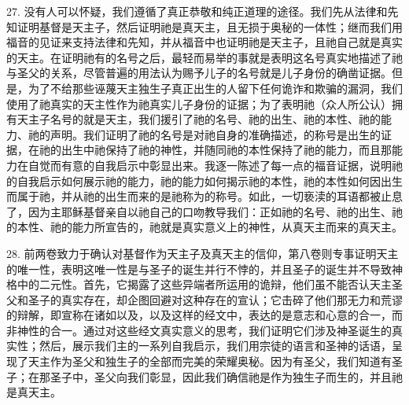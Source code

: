 27. 没有人可以怀疑，我们遵循了真正恭敬和纯正道理的途径。我们先从法律和先知证明基督是天主子，然后证明祂是真天主，且无损于奥秘的一体性；继而我们用福音的见证来支持法律和先知，并从福音中也证明祂是天主子，且祂自己就是真实的天主。在证明祂有的名号之后，最轻而易举的事就是表明这名号真实地描述了祂与圣父的关系，尽管普遍的用法认为赐予儿子的名号就是儿子身份的确凿证据。但是，为了不给那些诬蔑天主独生子真正出生的人留下任何诡诈和欺骗的漏洞，我们使用了祂真实的天主性作为祂真实儿子身份的证据；为了表明祂（众人所公认）拥有天主子名号的就是天主，我们援引了祂的名号、祂的出生、祂的本性、祂的能力、祂的声明。我们证明了祂的名号是对祂自身的准确描述，的称号是出生的证据，在祂的出生中祂保持了祂的神性，并随同祂的本性保持了祂的能力，而且那能力在自觉而有意的自我启示中彰显出来。我逐一陈述了每一点的福音证据，说明祂的自我启示如何展示祂的能力，祂的能力如何揭示祂的本性，祂的本性如何因出生而属于祂，并从祂的出生而来的是祂称为的称号。如此，一切亵渎的耳语都被止息了，因为主耶稣基督亲自以祂自己的口吻教导我们：正如祂的名号、祂的出生、祂的本性、祂的能力所宣告的，祂就是真实意义上的神性，从真天主而来的真天主。\par

28. 前两卷致力于确认对基督作为天主子及真天主的信仰，第八卷则专事证明天主的唯一性，表明这唯一性是与圣子的诞生并行不悖的，并且圣子的诞生并不导致神格中的二元性。首先，它揭露了这些异端者所运用的诡辩，他们虽不能否认天主圣父和圣子的真实存在，却企图回避对这种存在的宣认；它击碎了他们那无力和荒谬的辩解，即宣称在诸如以及，以及这样的经文中，表达的是意志和心意的合一，而非神性的合一。通过对这些经文真实意义的思考，我们证明它们涉及神圣诞生的真实性；然后，展示我们主的一系列自我启示，我们用宗徒的语言和圣神的话语，呈现了天主作为圣父和独生子的全部而完美的荣耀奥秘。因为有圣父，我们知道有圣子；在那圣子中，圣父向我们彰显，因此我们确信祂是作为独生子而生的，并且祂是真天主。\par


